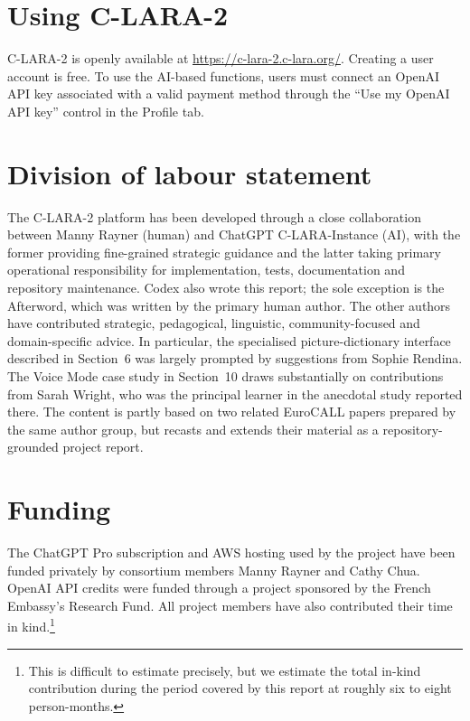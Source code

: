 \documentclass[11pt,a4paper]{article}
\begin{document}
\section*{Using C-LARA-2}
C-LARA-2 is openly available at \url{https://c-lara-2.c-lara.org/}.
Creating a user account is free. To use the AI-based functions, users must
connect an OpenAI API key associated with a valid payment method through the
``Use my OpenAI API key'' control in the Profile tab.

{}
\section*{Division of labour statement}
The C-LARA-2 platform has been developed through a close collaboration between
Manny Rayner (human) and ChatGPT C-LARA-Instance (AI), with the former providing
fine-grained strategic guidance and the latter taking primary operational
responsibility for implementation, tests, documentation and repository
maintenance. Codex also wrote this report; the sole exception is the Afterword,
which was written by the primary human author. The other authors have contributed strategic,
pedagogical, linguistic, community-focused and domain-specific advice. In
particular, the specialised picture-dictionary interface described in Section~6
was largely prompted by suggestions from Sophie Rendina. The Voice Mode case
study in Section~10 draws substantially on contributions from Sarah Wright, who
was the principal learner in the anecdotal study reported there. The content is
partly based on two related EuroCALL papers prepared by the same author group,
but recasts and extends their material as a repository-grounded project report.

{}
\section*{Funding}
The ChatGPT Pro subscription and AWS hosting used by the project have been
funded privately by consortium members Manny Rayner and Cathy Chua. OpenAI API
credits were funded through a project sponsored by the French Embassy's
Research Fund. All project members have also contributed their time in kind.\footnote{This is difficult to estimate precisely, but we estimate the total in-kind contribution during the period covered by this report at roughly six to eight person-months.}
\end{document}
